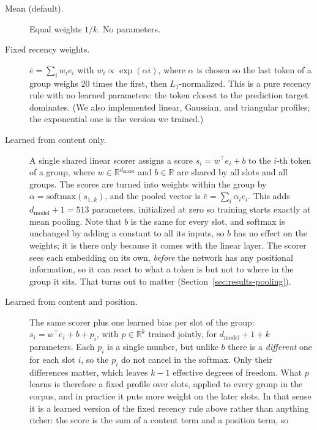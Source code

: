 \documentclass[11pt]{article}
\newcommand{\dmodel}{d_{\mathrm{model}}}
\begin{document}
\begin{description}
  \item[Mean (default).] Equal weights $1/k$. No parameters.
  \item[Fixed recency weights.] $\bar e = \sum_i w_i e_i$ with $w_i \propto
        \exp(\alpha i)$, where $\alpha$ is chosen so the last token of a group
        weighs 20 times the first, then $L_1$-normalized. This is a pure
        recency rule with no learned parameters: the token closest to the
        prediction target dominates. (We also implemented linear, Gaussian,
        and triangular profiles; the exponential one is the version we
        trained.)
  \item[Learned from content only.] A single shared linear scorer assigns a
        score $s_i = w^\top e_i + b$ to the $i$-th token of a group, where
        $w \in \mathbb{R}^{\dmodel}$ and $b \in \mathbb{R}$ are shared by all
        slots and all groups. The scores are turned into weights within the
        group by $\alpha = \mathrm{softmax}(s_{1..k})$, and the pooled vector
        is $\bar e = \sum_i \alpha_i e_i$. This adds $\dmodel + 1 = 513$
        parameters, initialized at zero so training starts exactly at mean
        pooling. Note that $b$ is the same for every slot, and softmax is
        unchanged by adding a constant to all its inputs, so $b$ has no effect
        on the weights; it is there only because it comes with the linear
        layer. The scorer sees each embedding on its own, \emph{before} the
        network has any positional information, so it can react to what a
        token is but not to where in the group it sits. That turns out to
        matter (Section~\ref{sec:results-pooling}).
  \item[Learned from content and position.] The same scorer plus one learned
        bias per slot of the group: $s_i = w^\top e_i + b + p_i$, with
        $p \in \mathbb{R}^k$ trained jointly, for $\dmodel + 1 + k$
        parameters. Each $p_i$ is a single number, but unlike $b$ there is a
        \emph{different} one for each slot $i$, so the $p_i$ do not cancel in
        the softmax. Only their differences matter, which leaves $k{-}1$
        effective degrees of freedom. What $p$ learns is therefore a fixed
        profile over slots, applied to every group in the corpus, and in
        practice it puts more weight on the later slots. In that sense it is a
        learned version of the fixed recency rule above rather than anything
        richer: the score is the sum of a content term and a position term, so

\end{description}
\end{document}
